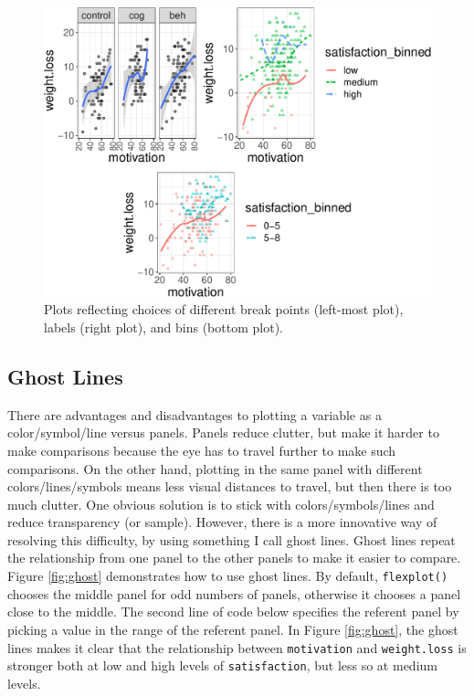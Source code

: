 \documentclass[
  man]{apa6}
\begin{document}
\begin{figure}

{\centering \includegraphics[width=1\linewidth]{flexplot_psychmeth_files/figure-latex/panels2-1} 

}

\caption{Plots reflecting choices of different break points (left-most plot), labels (right plot), and bins (bottom plot). \label{fig:panels2}}\label{fig:panels2}
\end{figure}

\hypertarget{ghost-lines}{%
\subsection{Ghost Lines}\label{ghost-lines}}

There are advantages and disadvantages to plotting a variable as a color/symbol/line versus panels. Panels reduce clutter, but make it harder to make comparisons because the eye has to travel further to make such comparisons. On the other hand, plotting in the same panel with different colors/lines/symbols means less visual distances to travel, but then there is too much clutter. One obvious solution is to stick with colors/symbols/lines and reduce transparency (or sample). However, there is a more innovative way of resolving this difficulty, by using something I call ghost lines. Ghost lines repeat the relationship from one panel to the other panels to make it easier to compare. Figure \ref{fig:ghost} demonstrates how to use ghost lines. By default, \texttt{flexplot()} chooses the middle panel for odd numbers of panels, otherwise it chooses a panel close to the middle. The second line of code below specifies the referent panel by picking a value in the range of the referent panel. In Figure \ref{fig:ghost}, the ghost lines makes it clear that the relationship between \texttt{motivation} and \texttt{weight.loss} is stronger both at low and high levels of \texttt{satisfaction}, but less so at medium levels.
\end{document}
